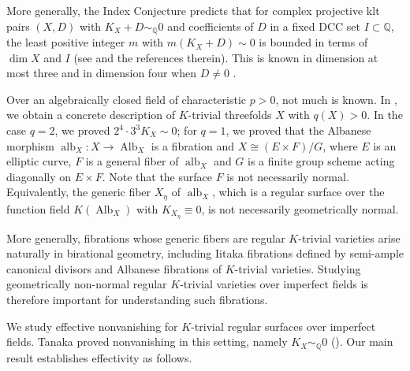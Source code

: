 \documentclass[10pt,abstract=true]{scrartcl}
\numberwithin{equation}{section}
\theoremstyle{definition}
\theoremstyle{remark}
\DeclareMathOperator\Alb{Alb}
\DeclareMathOperator\alb{alb}
\begin{document}
More generally, the Index Conjecture predicts that for complex projective klt pairs $(X,D)$ with $K_X+D\sim_{\mathbb Q}0$ and coefficients of $D$ in a fixed DCC set $I \subset \mathbb Q$, the least positive integer $m$ with $m(K_X+D)\sim0$ is bounded in terms of $\dim X$ and $I$ (see \cite{Xu-2019} and the references therein). This is known in dimension at most three \cite{Xu-2019,Jiang-Liu-2021} and in dimension four when $D\ne0$ \cite{Xu-2019}.

Over an algebraically closed field of characteristic $p>0$, not much is known.
In \cite{CWZ-classification}, we obtain a concrete description of $K$-trivial threefolds $X$ with $q(X) > 0$. 
In the case $q=2$, we proved $2^4\cdot 3^3 K_X \sim 0$; for $q = 1$, we proved that the Albanese morphism $\alb_X\colon X \to \Alb_X$ is a fibration and $X \cong (E \times F)/G$, where $E$ is an elliptic curve, $F$ is a general fiber of $\alb_X$ and $G$ is a finite group scheme acting diagonally on $E \times F$.
Note that the surface $F$ is not necessarily normal. 
Equivalently, the generic fiber $X_\eta$ of $\alb_X$, which is a regular surface over the function field $K(\Alb_X)$ with $K_{X_\eta} \equiv 0$, is not necessarily geometrically normal.

More generally, fibrations whose generic fibers are regular $K$-trivial varieties arise naturally in birational geometry, including Iitaka fibrations defined by semi-ample canonical divisors and Albanese fibrations of $K$-trivial varieties.
Studying geometrically non-normal regular $K$-trivial varieties over imperfect fields is therefore important for understanding such fibrations.

We study effective nonvanishing for $K$-trivial regular surfaces over imperfect fields.
Tanaka proved nonvanishing in this setting, namely $K_X \sim_{\mathbb{Q}} 0$ (\cite[Theorem~1.1]{tanaka_abundance_2020}).
Our main result establishes effectivity as follows.
\end{document}
